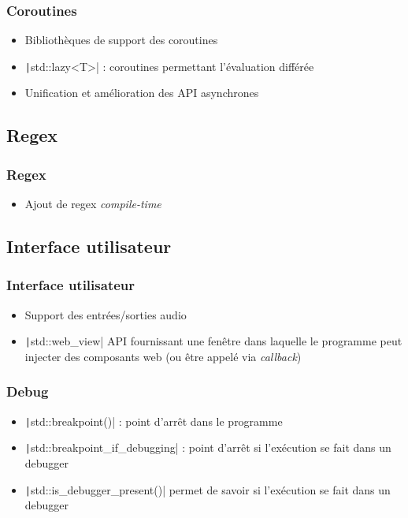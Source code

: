 \documentclass[C++.tex]{subfiles}
\begin{document}
\begin{frame}[fragile]
	\frametitle{Coroutines}
	\begin{itemize}
		\item Bibliothèques de support des coroutines
		\item \texttt|std::lazy<T>| : coroutines permettant l'évaluation différée
		\item Unification et amélioration des API asynchrones

	\end{itemize}
\end{frame}

\subsection*{Regex}
\begin{frame}[fragile]
	\frametitle{Regex}
	\begin{itemize}
		\item Ajout de regex \textit{compile-time}
	\end{itemize}
\end{frame}

\subsection*{Interface utilisateur}
\begin{frame}[fragile]
	\frametitle{Interface utilisateur}
	\begin{itemize}
		\item Support des entrées/sorties audio
		\item \texttt|std::web_view| API fournissant une fenêtre dans laquelle le programme peut injecter des composants web (ou être appelé via \textit{callback})
	\end{itemize}
\end{frame}

\begin{frame}[fragile]
	\frametitle{Debug}
	\begin{itemize}
		\item \texttt|std::breakpoint()| : point d'arrêt dans le programme
		\item \texttt|std::breakpoint_if_debugging| : point d'arrêt si l'exécution se fait dans un debugger
		\item \texttt|std::is_debugger_present()| permet de savoir si l'exécution se fait dans un debugger
	\end{itemize}
\end{frame}
\end{document}

